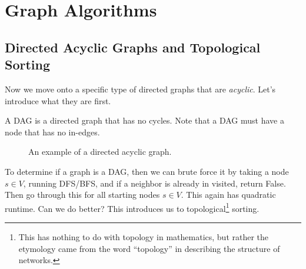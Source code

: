 \section{Graph Algorithms}

\subsection{Directed Acyclic Graphs and Topological Sorting}

  Now we move onto a specific type of directed graphs that are \textit{acyclic}. Let's introduce what they are first. 

  \begin{definition}
    A DAG is a directed graph that has no cycles. Note that a DAG must have a node that has no in-edges. 

    \begin{figure}[H]
      \centering 
      \caption{An example of a directed acyclic graph.} 
      \label{fig:dag}
    \end{figure}
  \end{definition} 

  To determine if a graph is a DAG, then we can brute force it by taking a node $s \in V$, running DFS/BFS, and if a neighbor is already in visited, return False. Then go through this for all starting nodes $s \in V$. This again has quadratic runtime. Can we do better? This introduces us to topological\footnote{This has nothing to do with topology in mathematics, but rather the etymology came from the word ``topology'' in describing the structure of networks.} sorting. 

